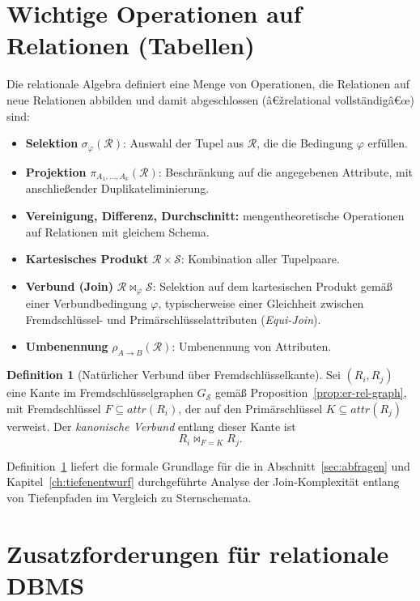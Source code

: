﻿\documentclass[a4paper,12pt]{report}
\theoremstyle{definition}
\newtheorem{definition}{Definition}[chapter]
\theoremstyle{remark}
\newcommand{\R}{\mathcal{R}}
\newcommand{\att}{\mathit{attr}}
\begin{document}
\section{Wichtige Operationen auf Relationen (Tabellen)}
\label{sec:relalg}

Die relationale Algebra definiert eine Menge von Operationen, die
Relationen auf neue Relationen abbilden und damit abgeschlossen
(â€žrelational vollständigâ€œ) sind:

\begin{itemize}
  \item \textbf{Selektion} $\sigma_{\varphi}(\R)$: Auswahl der Tupel aus
    $\R$, die die Bedingung $\varphi$ erfüllen.
  \item \textbf{Projektion} $\pi_{A_1,\ldots,A_k}(\R)$: Beschränkung auf
    die angegebenen Attribute, mit anschließender Duplikateliminierung.
  \item \textbf{Vereinigung, Differenz, Durchschnitt:} mengentheoretische
    Operationen auf Relationen mit gleichem Schema.
  \item \textbf{Kartesisches Produkt} $\R \times \mathcal{S}$: Kombination
    aller Tupelpaare.
  \item \textbf{Verbund (Join)} $\R \Join_{\varphi} \mathcal{S}$: Selektion
    auf dem kartesischen Produkt gemäß einer Verbundbedingung $\varphi$,
    typischerweise einer Gleichheit zwischen Fremdschlüssel- und
    Primärschlüsselattributen (\emph{Equi-Join}).
  \item \textbf{Umbenennung} $\rho_{A \to B}(\R)$: Umbenennung von
    Attributen.
\end{itemize}

\begin{definition}[Natürlicher Verbund über Fremdschlüsselkante]
\label{def:fk-join}
Sei $(R_i,R_j)$ eine Kante im Fremdschlüsselgraphen $G_{\mathcal{S}}$
gemäß Proposition~\ref{prop:er-rel-graph}, mit Fremdschlüssel
$F \subseteq \att(R_i)$, der auf den Primärschlüssel $K \subseteq
\att(R_j)$ verweist. Der \emph{kanonische Verbund} entlang dieser Kante
ist
\[
  R_i \Join_{F=K} R_j .
\]
\end{definition}

Definition~\ref{def:fk-join} liefert die formale Grundlage für die in
Abschnitt~\ref{sec:abfragen} und Kapitel~\ref{ch:tiefenentwurf}
durchgeführte Analyse der Join-Komplexität entlang von Tiefenpfaden im
Vergleich zu Sternschemata.

\section{Zusatzforderungen für relationale DBMS}
\label{sec:codd-rules}
\end{document}
